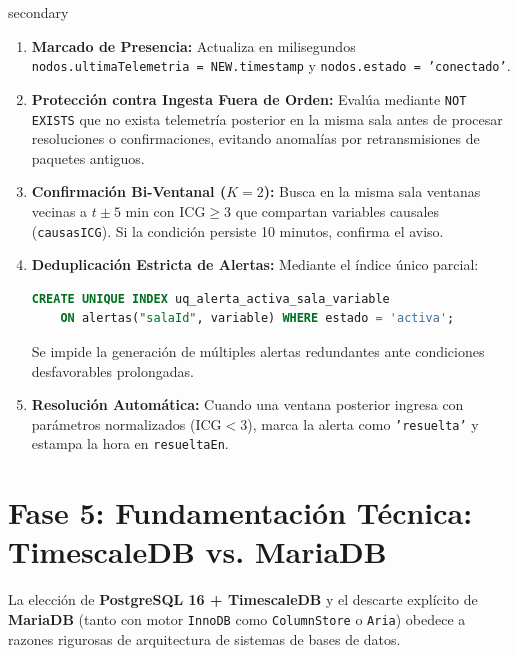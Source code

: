 \documentclass[11pt,a4paper]{article}
\begin{document}
\begin{calloutbox}[title=Lógica Transaccional del Trigger en PL/pgSQL]{secondary}
\begin{enumerate}
    \item \textbf{Marcado de Presencia:} Actualiza en milisegundos \texttt{nodos.ultimaTelemetria = NEW.timestamp} y \texttt{nodos.estado = 'conectado'}.
    \item \textbf{Protección contra Ingesta Fuera de Orden:} Evalúa mediante \texttt{NOT EXISTS} que no exista telemetría posterior en la misma sala antes de procesar resoluciones o confirmaciones, evitando anomalías por retransmisiones de paquetes antiguos.
    \item \textbf{Confirmación Bi-Ventanal ($K = 2$):} Busca en la misma sala ventanas vecinas a $t \pm 5\text{ min}$ con $\text{ICG} \ge 3$ que compartan variables causales (\texttt{causasICG}). Si la condición persiste 10 minutos, confirma el aviso.
    \item \textbf{Deduplicación Estricta de Alertas:} Mediante el índice único parcial:
    \begin{lstlisting}[language=SQL]
CREATE UNIQUE INDEX uq_alerta_activa_sala_variable 
    ON alertas("salaId", variable) WHERE estado = 'activa';
    \end{lstlisting}
    Se impide la generación de múltiples alertas redundantes ante condiciones desfavorables prolongadas.
    \item \textbf{Resolución Automática:} Cuando una ventana posterior ingresa con parámetros normalizados ($\text{ICG} < 3$), marca la alerta como \texttt{'resuelta'} y estampa la hora en \texttt{resueltaEn}.
\end{enumerate}
\end{calloutbox}

\clearpage
\section{Fase 5: Fundamentación Técnica: TimescaleDB vs. MariaDB}

La elección de \textbf{PostgreSQL 16 + TimescaleDB} y el descarte explícito de \textbf{MariaDB} (tanto con motor \texttt{InnoDB} como \texttt{ColumnStore} o \texttt{Aria}) obedece a razones rigurosas de arquitectura de sistemas de bases de datos.
\end{document}
